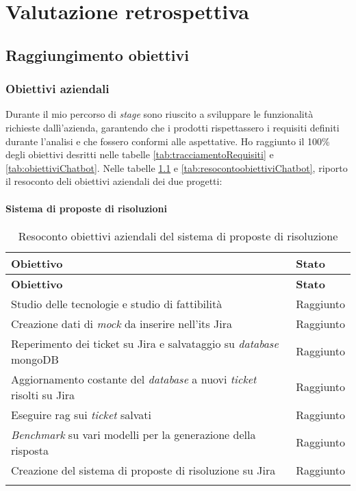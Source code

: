 \chapter{Valutazione retrospettiva}
\label{cap:conclusioni}

\section{Raggiungimento obiettivi}
\subsection{Obiettivi aziendali}
Durante il mio percorso di \textit{stage} sono riuscito a sviluppare le funzionalità richieste dallì'azienda, garantendo che i prodotti rispettassero i requisiti definiti durante l'analisi e che fossero conformi alle aspettative.
Ho raggiunto il 100\% degli obiettivi desritti nelle tabelle \ref{tab:tracciamentoRequisiti} e \ref{tab:obiettiviChatbot}.
Nelle tabelle \ref{tab:resocontoobiettiviJira} e \ref{tab:resocontoobiettiviChatbot}, riporto il resoconto deli obiettivi aziendali dei due progetti:

\subsubsection{Sistema di proposte di risoluzioni}
\renewcommand{\arraystretch}{2}
\begin{longtable}{|p{9cm}|p{2cm}|}
    \hline
    \rowcolor{tableheader}\textbf{Obiettivo} & \textbf{Stato}\\
    \hline
    \endfirsthead

    \rowcolor{tableheader}\textbf{Obiettivo} & \textbf{Stato}\\
    \hline
    \endhead

    \hline
    \endfoot

    \hline
    \endlastfoot

    \rowcolor{tableoddrow} Studio delle tecnologie e studio di fattibilità & Raggiunto \\
    \hline
    \rowcolor{tableevenrow} Creazione dati di \textit{mock} da inserire nell'\gls{its} Jira & Raggiunto \\
    \hline
    \rowcolor{tableoddrow} Reperimento dei ticket su Jira e salvataggio su \textit{database} mongoDB & Raggiunto \\
    \hline
    \rowcolor{tableevenrow} Aggiornamento costante del \textit{database} a nuovi \textit{ticket} risolti su Jira & Raggiunto \\
    \hline
    \rowcolor{tableoddrow} Eseguire \gls{rag} sui \textit{ticket} salvati & Raggiunto \\
    \hline
    \rowcolor{tableevenrow} \textit{Benchmark} su vari modelli per la generazione della risposta & Raggiunto \\
    \hline
    \rowcolor{tableoddrow} Creazione del sistema di proposte di risoluzione su Jira & Raggiunto \\
    \hline
    \caption{Resoconto obiettivi aziendali del sistema di proposte di risoluzione}
    \label{tab:resocontoobiettiviJira}
\end{longtable}

